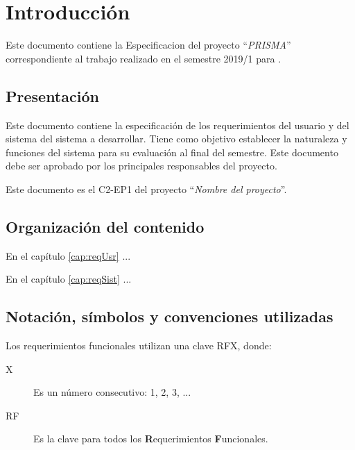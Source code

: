 \chapter{Introducción}


	Este documento contiene la Especificacion del proyecto ``{\em PRISMA}'' correspondiente al trabajo realizado en el semestre 2019/1 para .

\section{Presentación}


	Este documento contiene la especificación de los requerimientos del usuario y del sistema del sistema a desarrollar. Tiene como objetivo establecer la naturaleza y funciones del sistema para su evaluación al final del semestre. Este documento debe ser aprobado por los principales responsables del proyecto.
	
	Este documento es el C2-EP1 del proyecto ``{\em Nombre del proyecto}''.
	
\section{Organización del contenido}

	En el capítulo \ref{cap:reqUsr} ...
	
	En el capítulo \ref{cap:reqSist} ...

\section{Notación, símbolos y convenciones utilizadas}

	Los requerimientos funcionales utilizan una clave RFX, donde:
	
\begin{description}
	\item[X] Es un número consecutivo: 1, 2, 3, ...
	\item[RF] Es la clave para todos los {\bf R}equerimientos {\bf F}uncionales.
\end{description}

